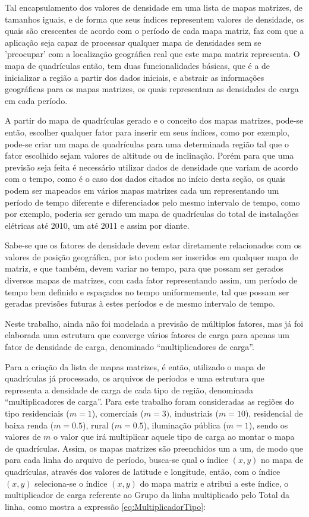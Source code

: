 Tal encapsulamento dos valores de densidade em uma lista de mapas matrizes, de tamanhos iguais, e de forma que seus índices representem valores de densidade, os quais são crescentes de acordo com o período de cada mapa matriz, faz com que a aplicação seja capaz de processar qualquer mapa de densidades sem se 'preocupar' com a localização geográfica real que este mapa matriz representa. O mapa de quadrículas então, tem duas funcionalidades básicas, que é a de inicializar a região a partir dos dados iniciais, e abstrair as informações geográficas para os mapas matrizes, os quais representam as densidades de carga em cada período.

A partir do mapa de quadrículas gerado e o conceito dos mapas matrizes, pode-se então, escolher qualquer fator para inserir em seus índices, como por exemplo, pode-se criar um mapa de quadrículas para uma determinada região tal que o fator escolhido sejam valores de altitude ou de inclinação. Porém para que uma previsão seja feita é necessário utilizar dados de densidade que variam de acordo com o tempo, como é o caso dos dados citados no início desta seção, os quais podem ser mapeados em vários mapas matrizes cada um representando um período de tempo diferente e diferenciados pelo mesmo intervalo de tempo, como por exemplo, poderia ser gerado um mapa de quadrículas do total de instalações elétricas até 2010, um até 2011 e assim por diante.

Sabe-se que os fatores de densidade devem estar diretamente relacionados com os valores de posição geográfica, por isto podem ser inseridos em qualquer mapa de matriz, e que também, devem variar no tempo, para que possam ser gerados diversos mapas de matrizes, com cada fator representando assim, um período de tempo bem definido e espaçados no tempo uniformemente, tal que possam ser geradas previsões futuras à estes períodos e de mesmo intervalo de tempo.

	Neste trabalho, ainda não foi modelada a previsão de múltiplos fatores, mas já foi elaborada uma estrutura que converge vários fatores de carga para apenas um fator de densidade de carga, denominado “multiplicadores de carga”.

Para a criação da lista de mapas matrizes, é então, utilizado o mapa de quadrículas já processado, os arquivos de períodos e uma estrutura que representa a densidade de carga de cada tipo de região, denominada “multiplicadores de carga”. Para este trabalho foram consideradas as regiões do tipo residenciais (\(m=1\)), comerciais (\(m=3)\), industriais (\(m=10\)), residencial de baixa renda (\(m=0.5\)), rural (\(m=0.5\)), iluminação pública (\(m=1\)), sendo os valores de \(m\) o valor que irá multiplicar aquele tipo de carga ao montar o mapa de quadrículas. Assim, os mapas matrizes são preenchidos um a um, de modo que para cada linha do arquivo de período, busca-se qual o índice \((x,y)\) no mapa de quadrículas, através dos valores de latitude e longitude, então, com o índice \((x,y)\) seleciona-se o índice \((x,y)\) do mapa matriz e atribui a este índice, o multiplicador de carga referente ao Grupo da linha multiplicado pelo Total da linha, como mostra a expressão \ref{eq:MultiplicadorTipo}:

